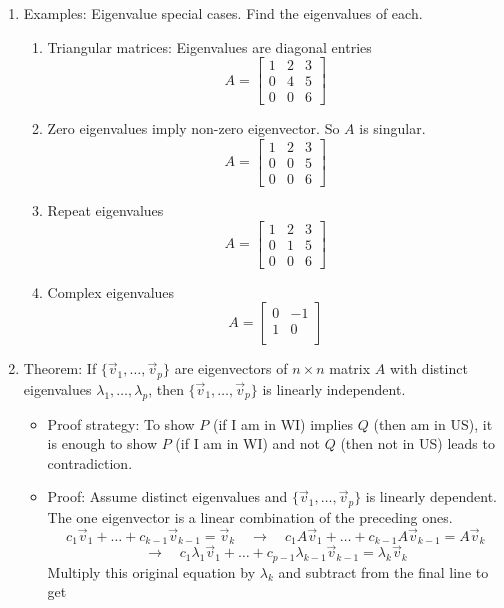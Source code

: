 \documentclass{article}
\begin{document}
\begin{enumerate}
\item Examples: Eigenvalue special cases. Find the eigenvalues of each.
\begin{enumerate}
\item Triangular matrices: Eigenvalues are diagonal entries
\[
A = \left[
\begin{array}{ccc}
1 & 2 & 3 \\
0 & 4 & 5 \\
0 & 0 & 6
\end{array}
\right]
\]
\item Zero eigenvalues imply non-zero eigenvector. So $A$ is singular.
\[
A = \left[
\begin{array}{ccc}
1 & 2 & 3 \\
0 & 0 & 5 \\
0 & 0 & 6
\end{array}
\right]
\]
\item Repeat eigenvalues
\[
A = \left[
\begin{array}{ccc}
1 & 2 & 3 \\
0 & 1 & 5 \\
0 & 0 & 6
\end{array}
\right]
\]
\item Complex eigenvalues
\[
A = \left[
\begin{array}{ccc}
0 & -1 \\
1 & 0 \\
\end{array}
\right]
\]
\end{enumerate}

\item Theorem: If $\{ \vec{v}_1, \dots, \vec{v}_p \}$ are eigenvectors of $n \times n$ matrix $A$ with distinct eigenvalues $\lambda_1, \dots, \lambda_p$, then $\{ \vec{v}_1, \dots, \vec{v}_p \}$ is linearly independent.
\begin{itemize}
\item Proof strategy: To show $P$ (if I am in WI) implies $Q$ (then am in US), it is enough to show $P$ (if I am in WI) and not $Q$ (then not in US) leads to contradiction.
\item Proof: Assume distinct eigenvalues and $\{ \vec{v}_1, \dots, \vec{v}_p \}$ is linearly dependent. The one eigenvector is a linear combination of the preceding ones.
\[
c_1 \vec{v}_1 + \dots + c_{k-1} \vec{v}_{k-1} = \vec{v}_k \quad \rightarrow \quad 
c_1 A\vec{v}_1 + \dots + c_{k-1} A\vec{v}_{k-1} = A\vec{v}_k
\]
\[
\rightarrow \quad 
c_1 \lambda_1 \vec{v}_1 + \dots + c_{p-1} \lambda_{k-1} \vec{v}_{k-1} = \lambda_k\vec{v}_k
\]
Multiply this original equation by $\lambda_k$ and subtract from the final line to get


\end{itemize}
\end{enumerate}
\end{document}
